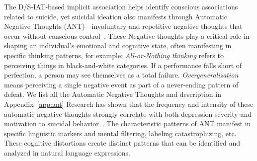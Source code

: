 The D/S-IAT-based implicit association helps identify conscious associations related to suicide, yet suicidal ideation also manifests through Automatic Negative Thoughts (ANT)—involuntary and repetitive negative thoughts that occur without conscious control~\cite{method9}. These Negative thoughts play a critical role in shaping an individual's emotional and cognitive state, often manifesting in specific thinking patterns, for example: \textit{All-or-Nothing thinking} refers to perceiving things in black-and-white categories. If a performance falls short of perfection, a person may see themselves as a total failure. \textit{Overgeneralization} means perceiving a single negative event as part of a never-ending pattern of defeat. We list all the Automatic Negative Thoughts and description in Appendix~\ref{app:ant} Research has shown that the frequency and intensity of these automatic negative thoughts strongly correlate with both depression severity and motivation to suicidal behavior~\cite{CAUDLE2024115787}. The characteristic patterns of ANT manifest in specific linguistic markers and mental filtering, labeling catastrophizing, etc. These cognitive distortions create distinct patterns that can be identified and analyzed in natural language expressions.
